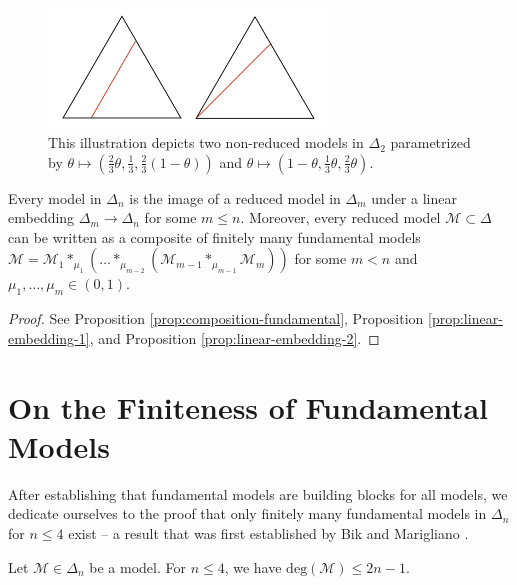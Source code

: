 \begin{example}
\begin{figure}[H]
    \centering
    \includegraphics[width=0.66\textwidth]{assets/non-red-models-delta-2.png}
    \caption{This illustration depicts two non-reduced models in \( \Delta_2 \) parametrized by \( \theta \mapsto (\frac{2}{3}\theta, \frac{1}{3}, \frac{2}{3}(1 - \theta)) \) and \( \theta \mapsto (1-\theta, \frac{1}{3}\theta, \frac{2}{3}\theta) \).} 
\end{figure}
\end{example}

\begin{theorem}\label{thm:classification-jekns}
    Every model in \( \Delta_n \) is the image of a reduced model in \( \Delta_m \) under a linear embedding \( \Delta_m \to \Delta_n \) for some \( m \leq n \). Moreover, every reduced model \( \mathcal{M} \subset \Delta \) can be written as a composite of finitely many fundamental models \( \mathcal{M} = \mathcal{M}_1 *_{\mu_1} ( \dots *_{\mu_{m-2}}( \mathcal{M}_{m-1} *_{\mu_{m-1}} \mathcal{M}_m) ) \)
    for some \( m < n \) and \( \mu_1, \dots, \mu_m \in (0,1) \).
\end{theorem}

\begin{proof}
    See Proposition \ref{prop:composition-fundamental}, Proposition \ref{prop:linear-embedding-1}, and Proposition \ref{prop:linear-embedding-2}.
\end{proof}

\section{On the Finiteness of Fundamental Models}



After establishing that fundamental models are building blocks for all models, we dedicate ourselves to the proof that only finitely many fundamental models in \( \Delta_n \) for \( n \leq 4 \) exist -- a result that was first established by Bik and Marigliano \cite{bik2022classifying}.

\begin{theorem}\label{thm:degree-fundamental-models}
    Let \( \mathcal{M} \in \Delta_n \) be a model. For \(n \leq 4 \), we have \( \mathrm{deg}(\mathcal{M}) \leq 2n - 1\).
\end{theorem}

